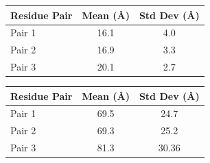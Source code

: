 \documentclass[a4paper,8pt]{beamer}
\begin{document}
\begin{frame}
\begin{minipage}{0.48\textwidth}
  \centering
  \begin{tabular}{lcc}
  \hline
  Residue Pair & Mean (Å) & Std Dev (Å) \\
  \hline
  Pair 1 & 16.1 & 4.0 \\
  Pair 2 & 16.9 & 3.3 \\
  Pair 3 & 20.1 & 2.7 \\
  \hline
  \end{tabular}
  \end{minipage}
  \hfill
  \begin{minipage}{0.48\textwidth}
  \centering
  \begin{tabular}{lcc}
  \hline
  Residue Pair & Mean (Å) & Std Dev (Å) \\
  \hline
  Pair 1 & 69.5 & 24.7 \\
  Pair 2 & 69.3 & 25.2 \\
  Pair 3 & 81.3 & 30.36 \\
  \hline
  \end{tabular}
  \end{minipage}
\end{frame}
%
\end{document}
